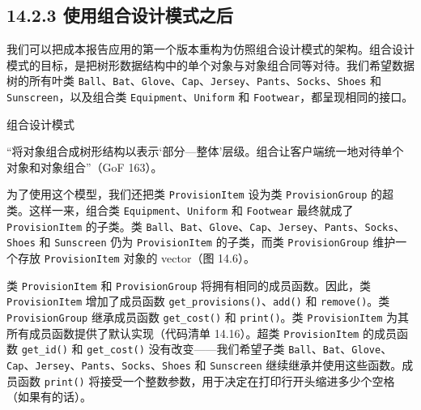 \subsection{14.2.3 使用组合设计模式之后}

我们可以把成本报告应用的第一个版本重构为仿照组合设计模式的架构。组合设计模式的目标，是把树形数据结构中的单个对象与对象组合同等对待。我们希望数据树的所有叶类 \texttt{Ball}、\texttt{Bat}、\texttt{Glove}、\texttt{Cap}、\texttt{Jersey}、\texttt{Pants}、\texttt{Socks}、\texttt{Shoes} 和 \texttt{Sunscreen}，以及组合类 \texttt{Equipment}、\texttt{Uniform} 和 \texttt{Footwear}，都呈现相同的接口。

\begin{mySidebar}{组合设计模式}

“将对象组合成树形结构以表示‘部分—整体’层级。组合让客户端统一地对待单个对象和对象组合”（GoF 163）。
\end{mySidebar}

为了使用这个模型，我们还把类 \texttt{Provision\allowbreak{}Item} 设为类 \texttt{Provision\allowbreak{}Group} 的超类。这样一来，组合类 \texttt{Equipment}、\texttt{Uniform} 和 \texttt{Footwear} 最终就成了 \texttt{Provision\allowbreak{}Item} 的子类。类 \texttt{Ball}、\texttt{Bat}、\texttt{Glove}、\texttt{Cap}、\texttt{Jersey}、\texttt{Pants}、\texttt{Socks}、\texttt{Shoes} 和 \texttt{Sunscreen} 仍为 \texttt{Provision\allowbreak{}Item} 的子类，而类 \texttt{Provision\allowbreak{}Group} 维护一个存放 \texttt{Provision\allowbreak{}Item} 对象的 vector（图 14.6）。


类 \texttt{Provision\allowbreak{}Item} 和 \texttt{Provision\allowbreak{}Group} 将拥有相同的成员函数。因此，类 \texttt{Provision\allowbreak{}Item} 增加了成员函数 \texttt{get\_\allowbreak{}provisions(\allowbreak{})\allowbreak{}}、\texttt{add()} 和 \texttt{remove()}。类 \texttt{Provision\allowbreak{}Group} 继承成员函数 \texttt{get\_\allowbreak{}cost(\allowbreak{})\allowbreak{}} 和 \texttt{print()}。类 \texttt{Provision\allowbreak{}Item} 为其所有成员函数提供了默认实现（代码清单 14.16）。超类 \texttt{Provision\allowbreak{}Item} 的成员函数 \texttt{get\_id()} 和 \texttt{get\_\allowbreak{}cost(\allowbreak{})\allowbreak{}} 没有改变——我们希望子类 \texttt{Ball}、\texttt{Bat}、\texttt{Glove}、\texttt{Cap}、\texttt{Jersey}、\texttt{Pants}、\texttt{Socks}、\texttt{Shoes} 和 \texttt{Sunscreen} 继续继承并使用这些函数。成员函数 \texttt{print()} 将接受一个整数参数，用于决定在打印行开头缩进多少个空格（如果有的话）。

